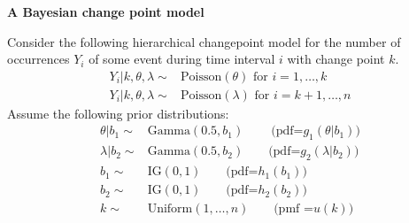 \documentclass[11pt]{article}
\begin{document}
\pagestyle{empty}
\begin{center}
\Large
{\bf  A Bayesian change point model}\\
\end{center}
\normalsize
Consider the following hierarchical changepoint model for the number
of occurrences $Y_i$ of some event during time interval $i$ with change point $k$.
\begin{equation*}
\begin{split}
Y_i |k,\theta,\lambda \sim & \mbox{Poisson}(\theta) \mbox{ for } i=1,\dots,k\\
Y_i |k,\theta,\lambda \sim & \mbox{Poisson}(\lambda) \mbox{ for } i=k+1,\dots,n
\end{split}
\end{equation*}
Assume the following prior distributions:
\begin{equation*}
\begin{split}
  \theta|b_1 \sim & \mbox{Gamma}(0.5,b_1)\:\:\:\:\:\:\:\:\:\:\mbox{(pdf=} g_1(\theta|b_1))\\
  \lambda|b_2 \sim &  \mbox{Gamma}(0.5,b_2)\:\:\:\:\:\:\:\:\: \mbox{(pdf=} g_2(\lambda|b_2))\\
  b_1 \sim & \mbox{IG}(0,1)\:\:\:\:\:\:\:\:\: \mbox{(pdf=} h_1(b_1))\\
  b_2 \sim & \mbox{IG}(0,1)\:\:\:\:\:\:\:\:\: \mbox{(pdf=} h_2(b_2))\\
  k \sim & \mbox{Uniform}(1,\dots,n)\:\:\:\:\:\:\:\:\: \mbox{(pmf =} u(k))
\end{split}
\end{equation*}
\end{document}
